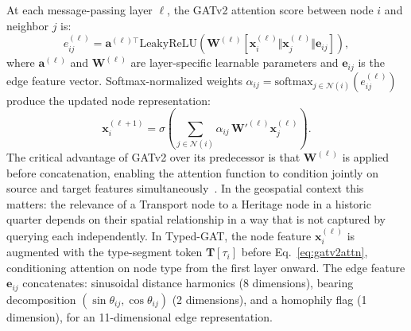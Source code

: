 \documentclass[]{interact}
\theoremstyle{plain}%
\theoremstyle{definition}
\theoremstyle{remark}
\begin{document}
At each message-passing layer $\ell$, the GATv2 attention score between node $i$ and neighbor $j$ is:
\begin{equation}
e_{ij}^{(\ell)} = \mathbf{a}^{(\ell)\top} \mathrm{LeakyReLU}\!\left(\mathbf{W}^{(\ell)}\!\left[\mathbf{x}_i^{(\ell)} \Vert \mathbf{x}_j^{(\ell)} \Vert \mathbf{e}_{ij}\right]\right),
\label{eq:gatv2attn}
\end{equation}
where $\mathbf{a}^{(\ell)}$ and $\mathbf{W}^{(\ell)}$ are layer-specific learnable parameters and $\mathbf{e}_{ij}$ is the edge feature vector. Softmax-normalized weights $\alpha_{ij} = \mathrm{softmax}_{j \in \mathcal{N}(i)}(e_{ij}^{(\ell)})$ produce the updated node representation:
\begin{equation}
\mathbf{x}_i^{(\ell+1)} = \sigma\!\left(\sum_{j \in \mathcal{N}(i)} \alpha_{ij}\, \mathbf{W}'^{(\ell)}\mathbf{x}_j^{(\ell)}\right).
\label{eq:gatv2update}
\end{equation}
The critical advantage of GATv2 over its predecessor is that $\mathbf{W}^{(\ell)}$ is applied before concatenation, enabling the attention function to condition jointly on source and target features simultaneously~\citep{brody2022attentivegraphattentionnetworks}. In the geospatial context this matters: the relevance of a Transport node to a Heritage node in a historic quarter depends on their spatial relationship in a way that is not captured by querying each independently. In Typed-GAT, the node feature $\mathbf{x}_i^{(\ell)}$ is augmented with the type-segment token $\mathbf{T}[\tau_i]$ before Eq.~\eqref{eq:gatv2attn}, conditioning attention on node type from the first layer onward. The edge feature $\mathbf{e}_{ij}$ concatenates: sinusoidal distance harmonics (8 dimensions), bearing decomposition $(\sin\theta_{ij}, \cos\theta_{ij})$ (2 dimensions), and a homophily flag (1 dimension), for an 11-dimensional edge representation.
\end{document}
